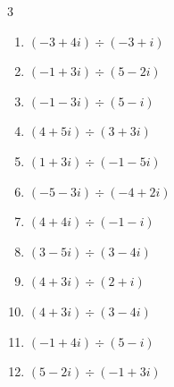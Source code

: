 \begin{multicols}{3}
\begin{enumerate}
  \item $\displaystyle (-3+4i)\div(-3+i)$


  \item $\displaystyle (-1+3i)\div(5-2i)$


  \item $\displaystyle (-1-3i)\div(5-i)$


  \item $\displaystyle (4+5i)\div(3+3i)$


  \item $\displaystyle (1+3i)\div(-1-5i)$


  \item $\displaystyle (-5-3i)\div(-4+2i)$


  \item $\displaystyle (4+4i)\div(-1-i)$

        \phantom{$\displaystyle =-4$}

  \item $\displaystyle (3-5i)\div(3-4i)$


\columnbreak %

\resetques

  \item $\displaystyle (4+3i)\div(2+i)$


  \item $\displaystyle (4+3i)\div(3-4i)$

        \phantom{$\displaystyle =i$}

  \item $\displaystyle (-1+4i)\div(5-i)$


  \item $\displaystyle (5-2i)\div(-1+3i)$


\end{enumerate}
\end{multicols}

